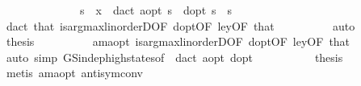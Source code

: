 \begin{isabellebody}
\ \ \ \ \isamarkupfalse%
\ {\isacharminus}{\kern0pt}\isanewline
\ \ \ \ \ \ \isamarkupfalse%
\ {\isachardoublequoteopen}s{\isacharprime}{\kern0pt}\ {\isasymle}\ x{\isacharprime}{\kern0pt}\ {\isasymLongrightarrow}\ d{\isacharunderscore}{\kern0pt}act\ a{\isacharunderscore}{\kern0pt}opt\ s{\isacharprime}{\kern0pt}\ {\isacharequal}{\kern0pt}\ d{\isacharunderscore}{\kern0pt}opt\ s{\isacharprime}{\kern0pt}{\isachardoublequoteclose}\ \ s{\isacharprime}{\kern0pt}\isanewline
\ \ \ \ \ \ \ \ \isamarkupfalse%
\ d{\isacharunderscore}{\kern0pt}act\ that\ is{\isacharunderscore}{\kern0pt}arg{\isacharunderscore}{\kern0pt}max{\isacharunderscore}{\kern0pt}linorderD{\isacharbrackleft}{\kern0pt}OF\ d{\isacharunderscore}{\kern0pt}opt{\isacharbrackleft}{\kern0pt}OF\ le{\isacharunderscore}{\kern0pt}y{\isacharbrackleft}{\kern0pt}OF\ that{\isacharbrackright}{\kern0pt}{\isacharbrackright}{\kern0pt}{\isacharbrackright}{\kern0pt}\isanewline
\ \ \ \ \ \ \ \ \isamarkupfalse%
\ auto\isanewline
\ \ \ \ \ \ \isamarkupfalse%
\ {\isacharquery}{\kern0pt}thesis\isanewline
\ \ \ \ \ \ \ \ \isamarkupfalse%
\ am{\isacharunderscore}{\kern0pt}a{\isacharunderscore}{\kern0pt}opt\ is{\isacharunderscore}{\kern0pt}arg{\isacharunderscore}{\kern0pt}max{\isacharunderscore}{\kern0pt}linorderD{\isacharbrackleft}{\kern0pt}OF\ d{\isacharunderscore}{\kern0pt}opt{\isacharbrackleft}{\kern0pt}OF\ le{\isacharunderscore}{\kern0pt}y{\isacharbrackleft}{\kern0pt}OF\ that{\isacharbrackright}{\kern0pt}{\isacharbrackright}{\kern0pt}{\isacharbrackright}{\kern0pt}\isanewline
\ \ \ \ \ \ \ \ \isamarkupfalse%
\ {\isacharparenleft}{\kern0pt}auto\ simp{\isacharcolon}{\kern0pt}\ GS{\isacharunderscore}{\kern0pt}indep{\isacharunderscore}{\kern0pt}high{\isacharunderscore}{\kern0pt}states{\isacharbrackleft}{\kern0pt}of\ {\isacharunderscore}{\kern0pt}\ {\isachardoublequoteopen}d{\isacharunderscore}{\kern0pt}act\ a{\isacharunderscore}{\kern0pt}opt{\isachardoublequoteclose}\ d{\isacharunderscore}{\kern0pt}opt{\isacharbrackright}{\kern0pt}{\isacharparenright}{\kern0pt}\isanewline
\ \ \ \ \isamarkupfalse%
\isanewline
\ \ \ \ \isamarkupfalse%
\ {\isacharquery}{\kern0pt}thesis\isanewline
\ \ \ \ \ \ \isamarkupfalse%
\ {\isacharparenleft}{\kern0pt}metis\ am{\isacharunderscore}{\kern0pt}a{\isacharunderscore}{\kern0pt}opt\ antisym{\isacharunderscore}{\kern0pt}conv{}{\isacharparenright}{\kern0pt}\isanewline
\ \ \isamarkupfalse%
\isanewline

\end{isabellebody}
